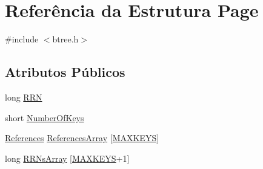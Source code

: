 \hypertarget{structPage}{\section{Referência da Estrutura Page}
\label{structPage}
}


{\ttfamily \#include $<$btree.\-h$>$}

\subsection*{Atributos Públicos}
\begin{DoxyCompactItemize}
\item 
long \hyperlink{structPage_a51a247adb6f674ece5503f277df96569}{R\-R\-N}
\item 
short \hyperlink{structPage_acdf847d542fe044c708988c73c085a12}{Number\-Of\-Keys}
\item 
\hyperlink{structReferences}{References} \hyperlink{structPage_aaebbe744e681558d4c4f88644e749c69}{References\-Array} \mbox{[}\hyperlink{btree_8h_af887e874f95feb203c6504bc3e0d5c94}{M\-A\-X\-K\-E\-Y\-S}\mbox{]}
\item 
long \hyperlink{structPage_ae69cef3a164fdc413fa54498f181974f}{R\-R\-Ns\-Array} \mbox{[}\hyperlink{btree_8h_af887e874f95feb203c6504bc3e0d5c94}{M\-A\-X\-K\-E\-Y\-S}+1\mbox{]}
\end{DoxyCompactItemize}



